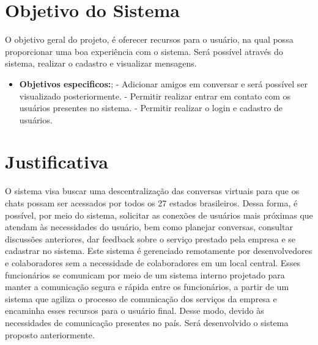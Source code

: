 \section{Objetivo do Sistema}
O objetivo geral do projeto, é oferecer recursos para o usuário, na qual possa proporcionar
uma boa experiência com o sistema. Será possível através do sistema, realizar o cadastro
e visualizar mensagens.

\begin{itemize}


     \item \textbf{Objetivos especificos:};
           \subitem - Adicionar amigos em conversar e será possível ser visualizado posteriormente.
           \subitem - Permitir realizar entrar em contato com os usuários presentes no sistema.
           \subitem - Permitir realizar o login e cadastro de usuários.
\end{itemize}


\section{Justificativa}

O sistema visa buscar uma descentralização das conversas virtuais para que os chats possam ser acessados por todos os 27 estados brasileiros. Dessa forma, é possível, por meio do sistema, solicitar as conexões de usuários mais próximas que atendam às necessidades do usuário, bem como planejar conversas, consultar discussões anteriores, dar feedback sobre o serviço prestado pela empresa e se cadastrar no sistema. Este sistema é gerenciado remotamente por desenvolvedores e colaboradores sem a necessidade de colaboradores em um local central. Esses funcionários se comunicam por meio de um sistema interno projetado para manter a comunicação segura e rápida entre os funcionários, a partir de um sistema que agiliza o processo de comunicação dos serviços da empresa e encaminha esses recursos para o usuário final.
Desse modo, devido às necessidades de comunicação presentes no país. Será desenvolvido o sistema proposto anteriormente.
